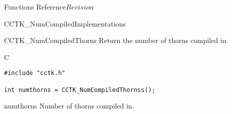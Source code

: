 \begin{cactuspart}{ Functions Reference}{}{$Revision$}
\begin{FunctionDescription}{CCTK\_NumCompiledImplementations}

\end{FunctionDescription}



\begin{FunctionDescription}{CCTK\_NumCompiledThorns}
\label{CCTK-NumCompiledThorns}
Return the number of thorns compiled in.

\begin{SynopsisSection}
\begin{Synopsis}{C}
\begin{verbatim}
#include "cctk.h"

int numthorns = CCTK_NumCompiledThornss();
\end{verbatim}
\end{Synopsis}
\end{SynopsisSection}

\begin{ResultSection}
\begin{Result}{numthorns}
Number of thorns compiled in.
\end{Result}
\end{ResultSection}




\end{FunctionDescription}
\end{cactuspart}
